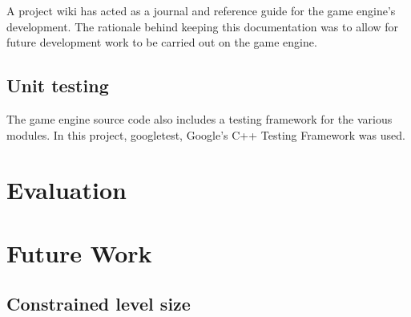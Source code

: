 \documentclass[11pt, a4paper, oneside]{report} %
\begin{document}
A project wiki has acted as a journal and reference guide for the game engine's 
development. The rationale behind keeping this documentation was to allow for 
future development work to be carried out on the game engine. 

\section{Unit testing}

The game engine source code also includes a testing framework for the various
modules. In this project, googletest, Google's C++ Testing Framework was used. 


\chapter{Evaluation}






\chapter{Future Work}

\section{Constrained level size}

\end{document}
